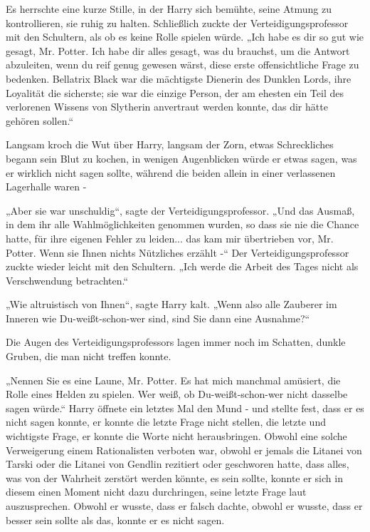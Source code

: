 {Es herrschte eine kurze Stille, in der Harry sich bemühte, seine Atmung zu kontrollieren, sie ruhig zu halten. Schließlich zuckte der Verteidigungsprofessor mit den Schultern, als ob es keine Rolle spielen würde. „Ich habe es dir so gut wie gesagt, Mr. Potter. Ich habe dir alles gesagt, was du brauchst, um die Antwort abzuleiten, wenn du reif genug gewesen wärst, diese erste offensichtliche Frage zu bedenken. Bellatrix Black war die mächtigste Dienerin des Dunklen Lords, ihre Loyalität die sicherste; sie war die einzige Person, der am ehesten ein Teil des verlorenen Wissens von Slytherin anvertraut werden konnte, das dir hätte gehören sollen.“

Langsam kroch die Wut über Harry, langsam der Zorn, etwas Schreckliches begann sein Blut zu kochen, in wenigen Augenblicken würde er etwas sagen, was er wirklich nicht sagen sollte, während die beiden allein in einer verlassenen Lagerhalle waren -

„Aber sie war unschuldig“, sagte der Verteidigungsprofessor. „Und das Ausmaß, in dem ihr alle Wahlmöglichkeiten genommen wurden, so dass sie nie die Chance hatte, für ihre eigenen Fehler zu leiden... das kam mir übertrieben vor, Mr. Potter. Wenn sie Ihnen nichts Nützliches erzählt -“ Der Verteidigungsprofessor zuckte wieder leicht mit den Schultern. „Ich werde die Arbeit des Tages nicht als Verschwendung betrachten.“

„Wie altruistisch von Ihnen“, sagte Harry kalt. „Wenn also alle Zauberer im Inneren wie Du-weißt-schon-wer sind, sind Sie dann eine Ausnahme?“

Die Augen des Verteidigungsprofessors lagen immer noch im Schatten, dunkle Gruben, die man nicht treffen konnte.

„Nennen Sie es eine Laune, Mr. Potter. Es hat mich manchmal amüsiert, die Rolle eines Helden zu spielen. Wer weiß, ob Du-weißt-schon-wer nicht dasselbe sagen würde.“ Harry öffnete ein letztes Mal den Mund - und stellte fest, dass er es nicht sagen konnte, er konnte die letzte Frage nicht stellen, die letzte und wichtigste Frage, er konnte die Worte nicht herausbringen. Obwohl eine solche Verweigerung einem Rationalisten verboten war, obwohl er jemals die Litanei von Tarski oder die Litanei von Gendlin rezitiert oder geschworen hatte, dass alles, was von der Wahrheit zerstört werden könnte, es sein sollte, konnte er sich in diesem einen Moment nicht dazu durchringen, seine letzte Frage laut auszusprechen. Obwohl er wusste, dass er falsch dachte, obwohl er wusste, dass er besser sein sollte als das, konnte er es nicht sagen.

}
